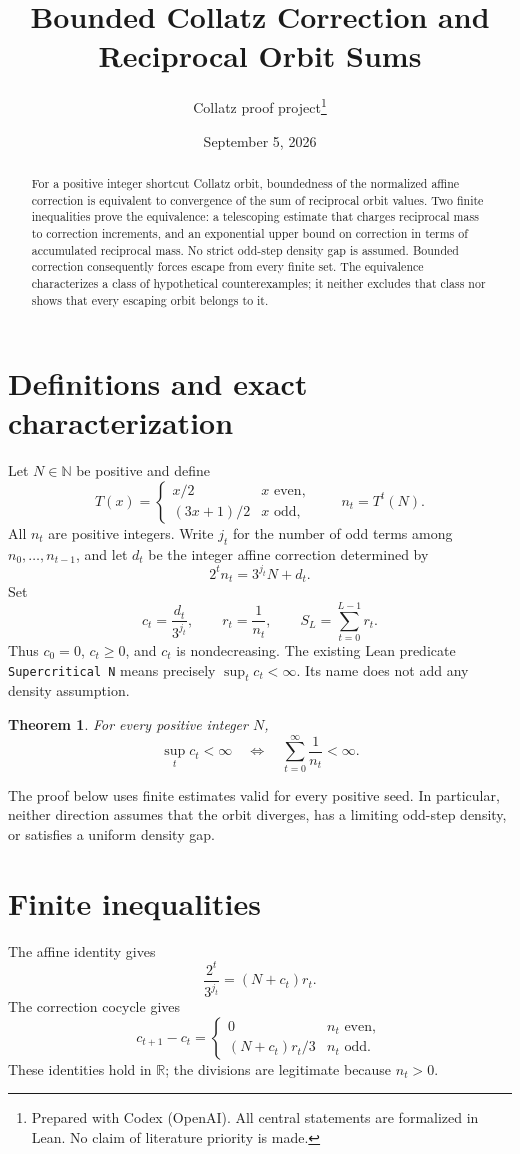 \documentclass[11pt]{article}
\title{Bounded Collatz Correction and Reciprocal Orbit Sums}
\author{Collatz proof project\thanks{Prepared with Codex (OpenAI). All central statements are formalized in Lean. No claim of literature priority is made.}}
\date{September 5, 2026}
\newtheorem{theorem}{Theorem}
\newcommand{\R}{\mathbb R}
\newcommand{\N}{\mathbb N}
\begin{document}
\maketitle
\begin{abstract}
For a positive integer shortcut Collatz orbit, boundedness of the normalized affine correction is equivalent to convergence of the sum of reciprocal orbit values. Two finite inequalities prove the equivalence: a telescoping estimate that charges reciprocal mass to correction increments, and an exponential upper bound on correction in terms of accumulated reciprocal mass. No strict odd-step density gap is assumed. Bounded correction consequently forces escape from every finite set. The equivalence characterizes a class of hypothetical counterexamples; it neither excludes that class nor shows that every escaping orbit belongs to it.
\end{abstract}

\section{Definitions and exact characterization}
Let $N\in\N$ be positive and define
\[
T(x)=\begin{cases}x/2&x\text{ even},\\(3x+1)/2&x\text{ odd},\end{cases}
\qquad n_t=T^t(N).
\]
All $n_t$ are positive integers. Write $j_t$ for the number of odd terms among $n_0,\ldots,n_{t-1}$, and let $d_t$ be the integer affine correction determined by
\[
2^t n_t=3^{j_t}N+d_t.
\]
Set
\[
c_t=\frac{d_t}{3^{j_t}},\qquad r_t=\frac1{n_t},\qquad
S_L=\sum_{t=0}^{L-1}r_t.
\]
Thus $c_0=0$, $c_t\ge0$, and $c_t$ is nondecreasing. The existing Lean predicate \texttt{Supercritical N} means precisely $\sup_t c_t<\infty$. Its name does not add any density assumption.

\begin{theorem}\label{thm:main}
For every positive integer $N$,
\[
\sup_t c_t<\infty\quad\Longleftrightarrow\quad
\sum_{t=0}^{\infty}\frac1{n_t}<\infty.
\]
\end{theorem}
The proof below uses finite estimates valid for every positive seed. In particular, neither direction assumes that the orbit diverges, has a limiting odd-step density, or satisfies a uniform density gap.

\newpage
\section{Finite inequalities}
The affine identity gives
\begin{equation}\label{eq:inverse}
\frac{2^t}{3^{j_t}}=(N+c_t)r_t.
\end{equation}
The correction cocycle gives
\begin{equation}\label{eq:increment}
c_{t+1}-c_t=
\begin{cases}
0&n_t\text{ even},\\
(N+c_t)r_t/3&n_t\text{ odd}.
\end{cases}
\end{equation}
These identities hold in $\R$; the divisions are legitimate because $n_t>0$.
\end{document}
